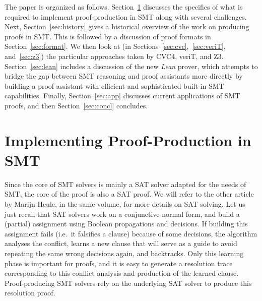 \documentclass{llncs}
\newcommand{\Note}[1]{\textcolor{blue}{[#1]}}
\begin{document}

The paper is organized as follows.  Section~\ref{sec:impl} discusses the
specifics of what is required to implement proof-production in SMT along with
several challenges.  Next, Section~\ref{sec:history} gives a historical
overview of the work on producing proofs in SMT.  This is followed by a
discussion of proof formats in Section~\ref{sec:format}.  We then look at (in
Sections~\ref{sec:cvc},~\ref{sec:veriT}, and~\ref{sec:z3}) the particular
approaches taken by CVC4, veriT, and Z3. Section~\ref{sec:lean} includes a
discussion of the new \emph{Lean} prover, which attempts to bridge the gap
between SMT reasoning and proof assistants more directly by building a proof
assistant with efficient and sophisticated built-in SMT capabilities.  Finally,
Section~\ref{sec:app} discusses current applications of SMT proofs, and then
Section~\ref{sec:concl} concludes.

\section{Implementing Proof-Production in SMT}
\label{sec:impl}

Since the core of SMT solvers is mainly a SAT solver adapted for the needs of
SMT, the core of the proof is also a SAT proof.  We will refer to the other
article by Marijn Heule, in the same volume, for more details on SAT solving.
Let us just recall that SAT solvers work on a conjunctive normal form, and build
a (partial) assignment using Boolean propagations and decisions.  If building
this assignment fails (i.e.\ it falsifies a clause) because of some decisions,
the algorithm analyses the conflict, learns a new clause that will serve as a
guide to avoid repeating the same wrong decisions again, and backtracks.  Only
this learning phase is important for proofs, and it is easy to generate a
resolution trace corresponding to this conflict analysis and production of the
learned clause.  Proof-producing SMT solvers rely on the underlying SAT solver
to produce this resolution proof.
\end{document}

